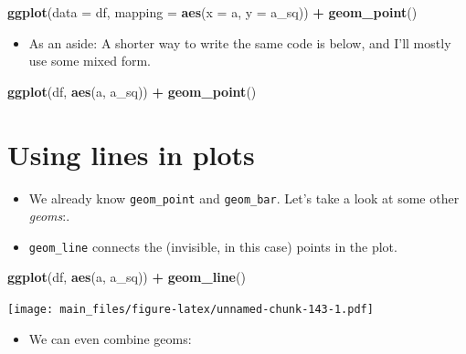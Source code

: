\documentclass[
]{book}
\newenvironment{Shaded}{\begin{snugshade}}{\end{snugshade}}
\newcommand{\AttributeTok}[1]{\textcolor[rgb]{0.13,0.29,0.53}{#1}}
\newcommand{\FunctionTok}[1]{\textcolor[rgb]{0.13,0.29,0.53}{\textbf{#1}}}
\newcommand{\NormalTok}[1]{#1}
\newcommand{\SpecialCharTok}[1]{\textcolor[rgb]{0.81,0.36,0.00}{\textbf{#1}}}
\providecommand{\tightlist}{%
  \setlength{\itemsep}{0pt}\setlength{\parskip}{0pt}}
\begin{document}
\begin{Shaded}
\begin{Highlighting}[]
\FunctionTok{ggplot}\NormalTok{(}\AttributeTok{data =}\NormalTok{ df, }\AttributeTok{mapping =} \FunctionTok{aes}\NormalTok{(}\AttributeTok{x =}\NormalTok{ a, }\AttributeTok{y =}\NormalTok{ a\_sq)) }\SpecialCharTok{+} \FunctionTok{geom\_point}\NormalTok{()}
\end{Highlighting}
\end{Shaded}

\begin{itemize}
\tightlist
\item
  As an aside: A shorter way to write the same code is below, and I'll mostly use some mixed form.
\end{itemize}

\begin{Shaded}
\begin{Highlighting}[]
\FunctionTok{ggplot}\NormalTok{(df, }\FunctionTok{aes}\NormalTok{(a, a\_sq)) }\SpecialCharTok{+} \FunctionTok{geom\_point}\NormalTok{()}
\end{Highlighting}
\end{Shaded}

\hypertarget{using-lines-in-plots}{%
\section{Using lines in plots}\label{using-lines-in-plots}}

\begin{itemize}
\item
  We already know \texttt{geom\_point} and \texttt{geom\_bar}. Let's take a look at some other \emph{geoms}:.
\item
  \texttt{geom\_line} connects the (invisible, in this case) points in the plot.
\end{itemize}

\begin{Shaded}
\begin{Highlighting}[]
\FunctionTok{ggplot}\NormalTok{(df, }\FunctionTok{aes}\NormalTok{(a, a\_sq)) }\SpecialCharTok{+} \FunctionTok{geom\_line}\NormalTok{()}
\end{Highlighting}
\end{Shaded}

\texttt{[image: main\_files/figure-latex/unnamed-chunk-143-1.pdf]}

\begin{itemize}
\tightlist
\item
  We can even combine geoms:
\end{itemize}
\end{document}
